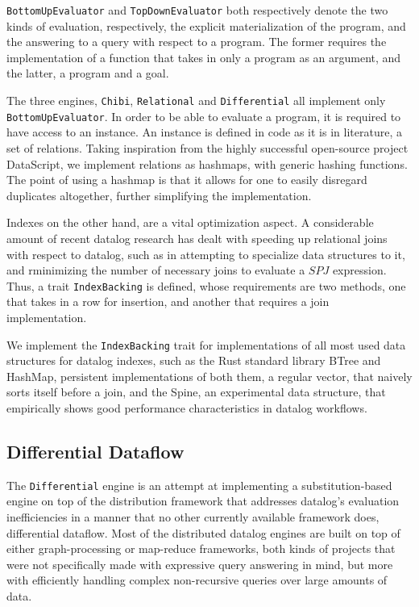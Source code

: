 \documentclass[manuscript,screen,review]{acmart}
\theoremstyle{definition}
\begin{document}
\verb|BottomUpEvaluator| and \verb|TopDownEvaluator| both respectively denote the two kinds of evaluation, respectively, the explicit
materialization of the program, and the answering to a query with respect to a program. The former requires the implementation of a function that takes
in only a program as an argument, and the latter, a program and a goal.

The three engines, \verb|Chibi|, \verb|Relational| and \verb|Differential| all implement only \verb|BottomUpEvaluator|. In order to be able to
evaluate a program, it is required to have access to an instance. An instance is defined in code as it is in literature, a set of relations. Taking
inspiration from the highly successful open-source project DataScript\cite{datascript}, we implement relations as hashmaps, with generic hashing
functions. The point of using a hashmap is that it allows for one to easily disregard duplicates altogether, further simplifying the implementation.

Indexes on the other hand, are a vital optimization aspect. A considerable amount of recent datalog research has dealt with speeding up relational joins
with respect to datalog, such as in attempting to specialize data structures to it\cite{souffle_btree}, and rminimizing the number of necessary
joins to evaluate a $SPJ$ expression\cite{primitive_search}. Thus, a trait \verb|IndexBacking| is defined, whose requirements are two methods, one
that takes in a row for insertion, and another that requires a join implementation.

We implement the \verb|IndexBacking| trait for implementations of all most used data structures for datalog indexes, such as the Rust standard
library BTree\cite{rust_btree} and HashMap, persistent implementations of both them, a regular vector, that naively sorts itself before a
join, and the Spine, an experimental data structure, that empirically shows good performance characteristics in datalog workflows.

\subsection{Differential Dataflow}

The \verb|Differential| engine is an attempt at implementing a substitution-based engine on top of the distribution framework that addresses datalog's
evaluation inefficiencies in a manner that no other currently available framework does, differential dataflow\cite{dd}. Most of the distributed datalog engines are
built on top of either graph-processing or map-reduce frameworks, both kinds of projects that were not specifically made with expressive query answering in mind, but
more with efficiently handling complex non-recursive queries over large amounts of data.
\end{document}
